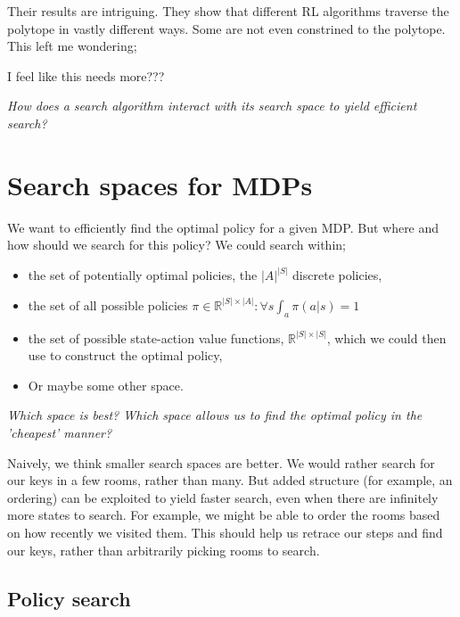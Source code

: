 Their results are intriguing. They show that different RL algorithms traverse the polytope in vastly different ways.
Some are not even constrined to the polytope. This left me wondering;

{\color{red}I feel like this needs more???}

\begin{displayquote}
  \textit{How does a search algorithm interact with its search space to yield efficient search?}
\end{displayquote}

\section{Search spaces for MDPs}\label{search-spaces-mdps}

We want to efficiently find the optimal policy for a given MDP. But where and how should we
search for this policy? We could search within;

\begin{itemize}
\tightlist
  \item the set of potentially optimal policies, the $|A|^{|S|}$ discrete policies,
  \item the set of all possible policies $\pi \in \mathbb R^{|S| \times |A|}: \forall s \int_a \pi(a|s) = 1$
  \item the set of possible state-action value functions, $\mathbb R^{|S|\times|S|}$,
  which we could then use to construct the optimal policy,
  \item Or maybe some other space.
\end{itemize}

\begin{displayquote}
  \textit{Which space is best? Which space allows us to find the optimal policy in the 'cheapest' manner?}
\end{displayquote}

Naively, we think smaller search spaces are better. We would rather
search for our keys in a few rooms, rather than many. But added
structure (for example, an ordering) can be exploited to yield faster
search, even when there are infinitely more states to search. For example,
we might be able to order the rooms based on how recently we visited them.
This should help us retrace our steps and find our keys, rather than arbitrarily
picking rooms to search.

\subsection{Policy search}

